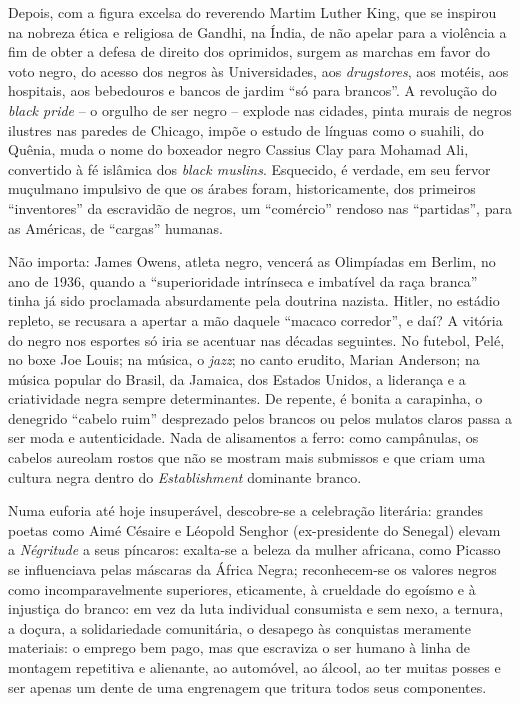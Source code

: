 \documentclass[
  letterpaper,
  DIV=11,
  numbers=noendperiod]{scrreprt}
\begin{document}
Depois, com a figura excelsa do reverendo Martim Luther King, que se
inspirou na nobreza ética e religiosa de Gandhi, na Índia, de não apelar
para a violência a fim de obter a defesa de direito dos oprimidos,
surgem as marchas em favor do voto negro, do acesso dos negros às
Universidades, aos \emph{drugstores}, aos motéis, aos hospitais, aos
bebedouros e bancos de jardim ``só para brancos''. A revolução do
\emph{black pride} -- o orgulho de ser negro -- explode nas cidades,
pinta murais de negros ilustres nas paredes de Chicago, impõe o estudo
de línguas como o suahili, do Quênia, muda o nome do boxeador negro
Cassius Clay para Mohamad Ali, convertido à fé islâmica dos \emph{black
muslins}. Esquecido, é verdade, em seu fervor muçulmano impulsivo de que
os árabes foram, historicamente, dos primeiros ``inventores'' da
escravidão de negros, um ``comércio'' rendoso nas ``partidas'', para as
Américas, de ``cargas'' humanas.

Não importa: James Owens, atleta negro, vencerá as Olimpíadas em Berlim,
no ano de 1936, quando a ``superioridade intrínseca e imbatível da raça
branca'' tinha já sido proclamada absurdamente pela doutrina nazista.
Hitler, no estádio repleto, se recusara a apertar a mão daquele ``macaco
corredor'', e daí? A vitória do negro nos esportes só iria se acentuar
nas décadas seguintes. No futebol, Pelé, no boxe Joe Louis; na música, o
\emph{jazz}; no canto erudito, Marian Anderson; na música popular do
Brasil, da Jamaica, dos Estados Unidos, a liderança e a criatividade
negra sempre determinantes. De repente, é bonita a carapinha, o
denegrido ``cabelo ruim'' desprezado pelos brancos ou pelos mulatos
claros passa a ser moda e autenticidade. Nada de alisamentos a ferro:
como campânulas, os cabelos aureolam rostos que não se mostram mais
submissos e que criam uma cultura negra dentro do \emph{Establishment}
dominante branco.

Numa euforia até hoje insuperável, descobre-se a celebração literária:
grandes poetas como Aimé Césaire e Léopold Senghor (ex-presidente do
Senegal) elevam a \emph{Négritude} a seus píncaros: exalta-se a beleza
da mulher africana, como Picasso se influenciava pelas máscaras da
África Negra; reconhecem-se os valores negros como incomparavelmente
superiores, eticamente, à crueldade do egoísmo e à injustiça do branco:
em vez da luta individual consumista e sem nexo, a ternura, a doçura, a
solidariedade comunitária, o desapego às conquistas meramente materiais:
o emprego bem pago, mas que escraviza o ser humano à linha de montagem
repetitiva e alienante, ao automóvel, ao álcool, ao ter muitas posses e
ser apenas um dente de uma engrenagem que tritura todos seus
componentes.
\end{document}
